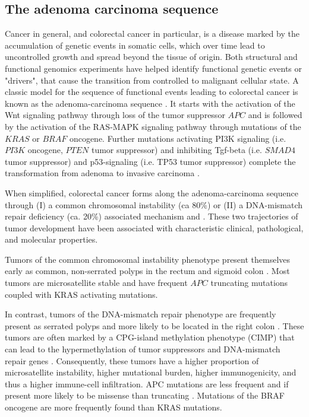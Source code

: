 \begin{flushleft}
\subsection{The adenoma carcinoma sequence}
Cancer in general, and colorectal cancer in particular, is a disease marked by the accumulation of genetic events in somatic cells, which over time lead to uncontrolled growth and spread beyond the tissue of origin. Both structural and functional genomics experiments have helped identify functional genetic events or "drivers", that cause the transition from controlled to malignant cellular state. A classic model for the sequence of functional events leading to colorectal cancer is known as the adenoma-carcinoma sequence \citep{vogelsteinGeneticAlterationsColorectaltumor1988}. It starts with the activation of the Wnt signaling pathway through loss of the tumor suppressor $APC$ and is followed by the activation of the RAS-MAPK signaling pathway through mutations of the $KRAS$ or $BRAF$ oncogene. Further mutations activating PI3K signaling (i.e. $PI3K$ oncogene, $PTEN$ tumor suppressor) and inhibiting Tgf-beta (i.e. $SMAD4$ tumor suppressor) and p53-signaling (i.e. TP53 tumor suppressor) complete the transformation from adenoma to invasive carcinoma \citep{fearonMolecularGeneticsColorectal2011}. \par

When simplified, colorectal cancer forms along the adenoma-carcinoma sequence through (I) a common chromosomal instability (ca 80\%) or (II) a DNA-mismatch repair deficiency (ca. 20\%) associated mechanism \citep{markowitzMolecularOriginsCancer2009} and \citep{pancioneGeneticEpigeneticEvents2012}. These two trajectories of tumor development have been associated with characteristic clinical, pathological, and molecular properties. 
\par

Tumors of the common chromosomal instability phenotype present themselves early as common, non-serrated polyps in the rectum and sigmoid colon \citep{markowitzMolecularOriginsCancer2009}. Most tumors are microsatellite stable and have frequent $APC$ truncating mutations coupled with KRAS activating mutations. 
\par 

In contrast, tumors of the DNA-mismatch repair phenotype are frequently present as serrated polyps and more likely to be located in the right colon \citep{markowitzMolecularOriginsCancer2009}. These tumors are often marked by a CPG-island methylation phenotype (CIMP) that can lead to the hypermethylation of tumor suppressors and DNA-mismatch repair genes \citep{oginoCpGIslandMethylator2009}. Consequently, these tumors have a higher proportion of microsatellite instability, higher mutational burden, higher immunogenicity, and thus a higher immune-cell infiltration. APC mutations are less frequent and if present more likely to be missense than truncating \citep{borowskyRoleAPCWNT2018}. Mutations of the BRAF oncogene are more frequently found than KRAS mutations. 
\par


\end{flushleft}
